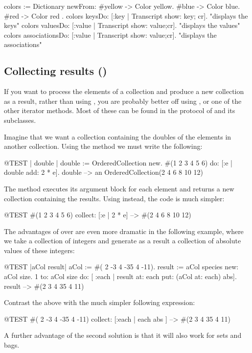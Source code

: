 \documentclass[a4paper,10pt,twoside]{book}
\begin{document}
\begin{code}{}
colors := Dictionary newFrom: { #yellow -> Color yellow. #blue -> Color blue. #red -> Color red }.
colors keysDo: [:key | Transcript show: key; cr].                    "displays the keys"
colors valuesDo: [:value | Transcript show: value;cr].            "displays the values"
colors associationsDo: [:value | Transcript show: value;cr].  "displays the associations"
\end{code}

\subsection{Collecting results ()}
If you want to process the elements of a collection and produce a new collection as a result, rather than using , you are probably better off using , or one of the other iterator methods.
Most of these can be found in the  protocol of  and its subclasses.

Imagine that we want a collection containing the doubles of the elements in another collection. Using the method  we must write the following:

\begin{code}{@TEST | double |}
double := OrderedCollection new.
#(1 2 3 4 5 6) do: [:e | double add: 2 * e].
double --> an OrderedCollection(2 4 6 8 10 12)
\end{code}

\noindent
The method  executes its argument block for each element and returns a new collection containing the results. 
Using  instead, the code is much simpler:
\begin{code}{@TEST}
#(1 2 3 4 5 6) collect: [:e | 2 * e] --> #(2 4 6 8 10 12)
\end{code}

The advantages of  over  are even more dramatic in the following example, where we take a collection of integers and generate as a result a collection of absolute values of these integers:

\begin{code}{@TEST |aCol result|}
aCol :=  #( 2 -3 4 -35 4 -11).
result := aCol species new: aCol size.
1 to: aCol size do: [ :each | result at: each put: (aCol at: each) abs].
result --> #(2 3 4 35 4 11)
\end{code}
\noindent
Contrast the above with the much simpler following expression:
\begin{code}{@TEST}
#( 2 -3 4 -35 4 -11) collect: [:each | each abs ] --> #(2 3 4 35 4 11)
\end{code}
\noindent
A further advantage of the second solution is that it will also work for sets and bags.
\end{document}
